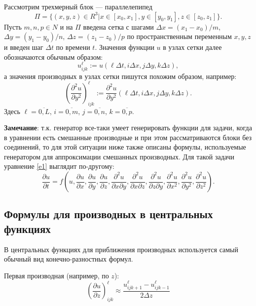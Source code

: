 \documentclass[a4paper]{article}
\begin{document}
Рассмотрим трехмерный блок --- параллелепипед
\begin{equation*}
\Pi = \{(x,y,z) \in R^3| x \in [x_0, x_1], y \in [y_0, y_1], z \in [z_0, z_1]\}.
\end{equation*}
Пусть $m,n,p\in N$ и на $\Pi$ введена сетка с шагами $\Delta x = (x_1-x_0)/m$, $\Delta y = (y_1-y_0)/n$, $\Delta z = (z_1-z_0)/p$ по про\-стран\-ствен\-ным переменным $x,y,z$ и введен шаг $\Delta t$ по времени $t$. Значения функции $u$ в узлах сетки далее обозначаются обычным образом:
\begin{equation*}
u^{\ell}_{ijk} := u(\ell\Delta t, i\Delta x, j\Delta y, k\Delta z),
\end{equation*}
а значения производных в узлах сетки пишутся похожим образом, например:
\begin{equation*}
\left(\frac{\partial^2 u}{\partial y^2}\right)^{\ell}_{ijk} := \frac{\partial^2 u}{\partial y^2}(\ell\Delta t, i\Delta x, j\Delta y, k\Delta z).
\end{equation*}
Здесь $\ell = \overline{0,L}$, $i = \overline{0,m}$, $j = \overline{0,n}$, $k = \overline{0,p}$.

{\bf Замечание}: т.к. генератор все-таки умеет генерировать функции для задачи, когда в уравнении есть смешанные производные и при этом рассматриваются блоки без соединений, то для этой ситуации ниже также описаны формулы, используемые генератором для аппроксимации смешанных производных. Для такой задачи урав\-не\-ние \eqref{e1} выглядит по-другому:
\begin{equation}\label{e2}
\frac{\partial u}{\partial t} = f\left(u, \frac{\partial u}{\partial x}, \frac{\partial u}{\partial y}, \frac{\partial u}{\partial z}, \frac{\partial^2 u}{\partial x\partial y}, \frac{\partial^2 u}{\partial x\partial z}, \frac{\partial^2 u}{\partial z\partial y}, \frac{\partial^2 u}{\partial x^2}, \frac{\partial^2 u}{\partial y^2}, \frac{\partial^2 u}{\partial z^2}\right).
\end{equation} 

\subsection{\Large Формулы для производных в центральных функциях}
В центральных функциях для приближения производных используется самый обычный вид конечно-разностных формул.

Первая производная (например, по $z$):
\begin{equation*}
\left(\frac{\partial u}{\partial z}\right)^{\ell}_{ijk} \approx \frac{u^{\ell}_{ijk+1} - u^{\ell}_{ijk-1}}{2\Delta z}
\end{equation*}
\end{document}
